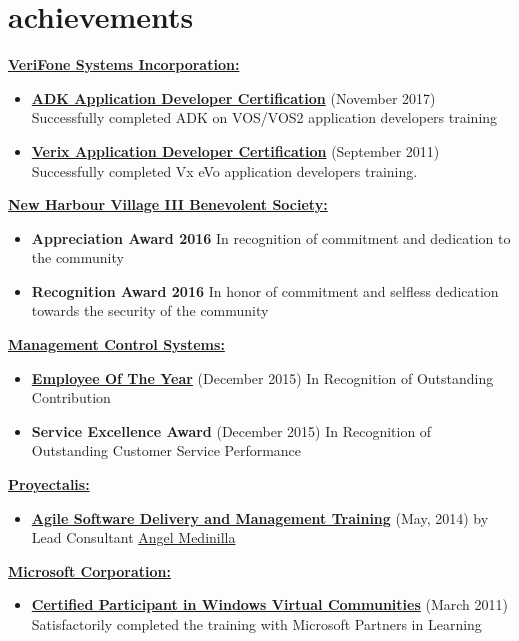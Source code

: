 \documentclass[]{friggeri-cvRS}
\begin{document}
\section{achievements}
\textbf{\underline{VeriFone Systems Incorporation:}}
	\begin{itemize}
		\item \textbf{\href{https://www.verifonedevnet.com/verifone/devnet/dnHome.do}{ADK Application Developer Certification}} (November 2017) Successfully completed ADK on VOS/VOS2 application developers training
		\item \textbf{\href{https://www.verifonedevnet.com/verifone/devnet/dnHome.do}{Verix Application Developer Certification}} (September 2011) Successfully completed Vx eVo application developers training.
	\end{itemize}
\textbf{\underline{New Harbour Village III Benevolent Society:}}
	\begin{itemize}
		\item \textbf{Appreciation Award 2016} In recognition of commitment and dedication to the community
		\item \textbf{Recognition Award 2016} In honor of commitment and selfless dedication towards the security of the community
	\end{itemize}
\textbf{\underline{Management Control Systems:}}
	\begin{itemize}
		\item \textbf{\href{http://www.jamaicaobserver.com/news/MC-Systems-awards}{Employee Of The Year}} (December 2015) In Recognition of Outstanding Contribution
		\item \textbf{Service Excellence Award} (December 2015) In Recognition of Outstanding Customer Service Performance
	\end{itemize}
\textbf{\underline{Proyectalis:}}
	\begin{itemize}
		\item \textbf{\href{http://www.proyectalis.com/en/servicios/}{Agile Software Delivery and Management Training}} (May, 2014) by Lead Consultant \href{http://www.proyectalis.com/en/angelmedinilla/}{Angel Medinilla}
	\end{itemize}
\textbf{\underline{Microsoft Corporation:}}
	\begin{itemize}
		\item \textbf{\href{https://mva.microsoft.com/}{Certified Participant in Windows Virtual Communities}} (March 2011) Satisfactorily completed the training with Microsoft Partners in Learning
	\end{itemize}
\end{document}
